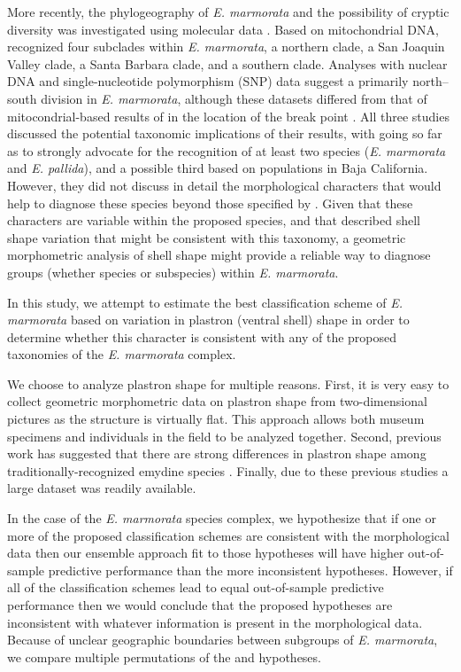 \documentclass[11pt]{article}
\begin{document}
More recently, the phylogeography of \textit{E. marmorata} and the possibility of cryptic diversity was investigated using molecular data \citep{Spinks2005,Spinks2010,Spinks2014}. Based on mitochondrial DNA, \citet{Spinks2005} recognized four subclades within \textit{E. marmorata}, a northern clade, a San Joaquin Valley clade, a Santa Barbara clade, and a southern clade. Analyses with nuclear DNA \citep{Spinks2010} and single-nucleotide polymorphism (SNP) data suggest a primarily north--south division in \textit{E. marmorata}, although these datasets differed from that of mitocondrial-based results of \citet{Spinks2005} in the location of the break point \citep{Spinks2014}. All three studies discussed the potential taxonomic implications of their results, with \citet{Spinks2014} going so far as to strongly advocate for the recognition of at least two species (\emph{E. marmorata} and \emph{E. pallida}), and a possible third based on populations in Baja California. However, they did not discuss in detail the morphological characters that would help to diagnose these species beyond those specified by \citet{Seeliger1945}. Given that these characters are variable within the proposed species, and that \citet{Holland1992} described shell shape variation that might be consistent with this taxonomy, a geometric morphometric analysis of shell shape might provide a reliable way to diagnose groups (whether species or subspecies) within \textit{E. marmorata}.

In this study, we attempt to estimate the best classification scheme of \textit{E. marmorata} based on variation in plastron (ventral shell) shape in order to determine whether this character is consistent with any of the proposed taxonomies of the \textit{E. marmorata} complex. 

We choose to analyze plastron shape for multiple reasons. First, it is very easy to collect geometric morphometric data on plastron shape from two-dimensional pictures as the structure is virtually flat. This approach allows both museum specimens and individuals in the field to be analyzed together. Second, previous work has suggested that there are strong differences in plastron shape among traditionally-recognized emydine species \citep{Angielczyk2007,Angielczyk2011,Angielczyk2013a}. Finally, due to these previous studies a large dataset was readily available.

In the case of the \textit{E. marmorata} species complex, we hypothesize that if one or more of the proposed classification schemes are consistent with the morphological data then our ensemble approach fit to those hypotheses will have higher out-of-sample predictive performance than the more inconsistent hypotheses. However, if all of the classification schemes lead to equal out-of-sample predictive performance then we would conclude that the proposed hypotheses are inconsistent with whatever information is present in the morphological data. Because of unclear geographic boundaries between subgroups of \textit{E. marmorata}, we compare multiple permutations of the \citep{Spinks2010} and \citet{Spinks2014} hypotheses.
\end{document}
